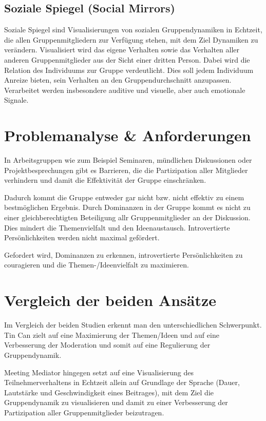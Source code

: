 \documentclass{seminarvorlage}
\begin{document}
\subsection{Soziale Spiegel (Social Mirrors)}
Soziale Spiegel \cite{BergKara2009-2} sind Visualisierungen von sozialen
Gruppendynamiken in Echtzeit, die allen Gruppenmitgliedern zur Verfügung stehen,
mit dem Ziel Dynamiken zu ver\-änd\-ern. Visualisiert wird das eigene Verhalten
sowie das Verhalten aller anderen Gruppenmitglieder aus der Sicht einer dritten
Person. Dabei wird die Relation des Individuums zur Gruppe verdeutlicht. Dies
soll jedem Individuum Anreize bieten, sein Verhalten an den Gruppendurchschnitt
anzupassen. Verarbeitet werden insbesondere auditive und visuelle, aber
auch emotionale Signale.

\section{Problemanalyse \& Anforderungen}
In Arbeitsgruppen wie zum Beispiel Seminaren, münd\-lich\-en Diskussionen oder
Projektbesprechungen gibt es Barrieren, die die Partizipation aller
Mitglieder verhindern und damit die Effektivität der Gruppe einschränken.

Dadurch kommt die Gruppe entweder gar nicht bzw. nicht effektiv zu einem
best\-mög\-lich\-en Ergebnis. Durch Dominanzen in der Gruppe kommt es nicht zu
einer gleichberechtigten Beteiligung allr Gruppenmitglieder an der Diskussion.
Dies mindert die Themenvielfalt und den Ideenaustausch. Introvertierte
Per\-sön\-lich\-keit\-en werden nicht maximal gefördert.

Gefordert wird, Dominanzen zu erkennen, introvertierte Per\-sön\-lich\-keit\-en
zu couragieren und die Themen-/\-Ideen\-vielfalt zu maximieren.




\section{Vergleich der beiden Ansätze}
Im Vergleich der beiden Studien erkennt man den unterschiedlichen Schwerpunkt.
Tin Can zielt auf eine Maximierung der Themen/Ideen und auf eine Verbesserung
der Moderation und somit auf eine Regulierung der Gruppendynamik.

Meeting Mediator hingegen setzt auf eine Visualisierung des Teilnehmerverhaltens
in Echtzeit allein auf Grundlage der Sprache (Dauer, Lautstärke und
Geschwindigkeit eines Beitrages), mit dem Ziel die Gruppendynamik zu
visualisieren und damit zu einer Verbesserung der Partizipation aller
Gruppenmitglieder beizutragen.
\end{document}
